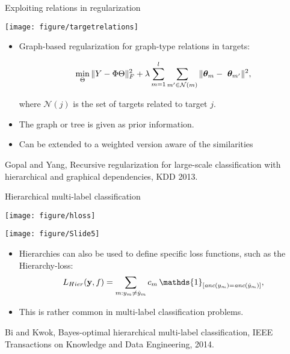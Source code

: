 \documentclass[11pt,compress,t,notes=noshow, xcolor=table]{beamer}
\begin{document}
\begin{frame}{Exploiting relations in regularization}

	\begin{center}
		\texttt{[image: figure/targetrelations]}
	\end{center} 

	\begin{itemize}
		\item Graph-based regularization for graph-type relations in targets: 

		\begin{equation*}
			\min_\Theta \|Y - \Phi \Theta \|^2_F + \lambda \sum_{m=1}^l \sum_{m' \in \mathcal{N}(m)} \|\thetav_m - \ \thetav_{m'}\|^2,
		\end{equation*}

		where $\mathcal{N}(j)$ is the set of targets related to target $j.$
        \item The graph or tree is given as prior information.
		
		\item Can be extended to a weighted version aware of the similarities
	
	\end{itemize}

	{\tiny Gopal and Yang, Recursive regularization for large-scale classification with hierarchical and graphical dependencies, KDD 2013.}
\end{frame}

\begin{frame}{Hierarchical multi-label classification}
	
	\begin{minipage}{0.60\textwidth}  
        \centering
        \texttt{[image: figure/hloss]}
    \end{minipage}
    \hfill
    \begin{minipage}{0.39\textwidth}    
        \centering
		\texttt{[image: figure/Slide5]}
    \end{minipage}
    
    \begin{itemize}
        \item  Hierarchies can also be used to define specific loss functions, such as the Hierarchy-loss: $$L_{Hier}(\yv, f) = \sum_{m: y_m \neq \hat{y}_m} c_m \, \mathds{1}_{ [\textit{anc}(y_m) = \textit{anc}(\hat{y}_m)]  },$$
        \item This is rather common in multi-label classification problems.
    \end{itemize}
    
	{\tiny Bi and Kwok, Bayes-optimal hierarchical multi-label classification, IEEE Transactions on Knowledge and Data Engineering, 2014.}

\end{frame}
\end{document}
